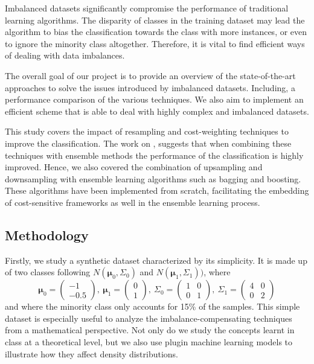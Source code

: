 \documentclass[conference]{IEEEtran}
\begin{document}
	Imbalanced datasets significantly compromise the performance of traditional learning algorithms. The disparity of classes in the training dataset may lead the algorithm to bias the classification towards the class with more instances, or even to ignore the minority class altogether. Therefore, it is vital to find efficient ways of dealing with data imbalances.

	The overall goal of our project is to provide an overview of the state-of-the-art approaches to solve the issues introduced by imbalanced datasets. Including, a performance comparison of the various techniques. We also aim to implement an efficient scheme that is able to deal with highly complex and imbalanced datasets.

This study covers the impact of resampling and cost-weighting techniques to improve the classification. The work on \cite{ensembles_review}, suggests that when combining these techniques with ensemble methods the performance of the classification is highly improved. Hence, we also covered the combination of upsampling and downsampling with ensemble learning algorithms such as bagging and boosting. These algorithms have been implemented from scratch, facilitating the embedding of cost-sensitive frameworks as well in the ensemble learning process.

	\subsection{Methodology}
	Firstly, we study a synthetic dataset characterized by its simplicity. It is made up of two classes following $N(\boldsymbol\mu_0, \Sigma_0)$ and $N(\boldsymbol\mu_1, \Sigma_1))$, where
			\begin{equation*}
				\boldsymbol\mu_0=
				\begin{pmatrix}
					-1\\
					-0.5
				\end{pmatrix},\ %
				\boldsymbol\mu_1=
				\begin{pmatrix}
					0\\
					1
				\end{pmatrix},\ %
				\Sigma_0=
				\begin{pmatrix}
					1 & 0\\
					0 & 1
				\end{pmatrix},\ %
				\Sigma_1=
				\begin{pmatrix}
					4 & 0\\
					0 & 2
				\end{pmatrix}
			\end{equation*} and where the minority class only accounts for 15\% of the samples. This simple dataset is especially useful to analyze the imbalance-compensating techniques from a mathematical perspective. Not only do we study the concepts learnt in class at a theoretical level, but we also use plugin machine learning models to illustrate how they affect density distributions.
\end{document}
